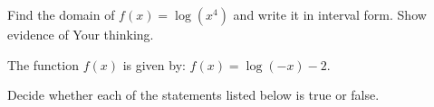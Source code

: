 \documentclass[11pt,answers]{exam}
\begin{document}
\begin{questions}


\addpoints



\question[2] Find the domain of $\displaystyle f(x)=\log \left (x^4\right)$ and write it in interval form. Show evidence of Your thinking.


\fillwithdottedlines{3cm}

\medskip

\question The function $f(x)$ is given by: $\displaystyle f(x) = \log (-x)-2$. 


\medskip

\question Decide whether each of the statements listed below is true or false.


\end{questions}
\end{document}

